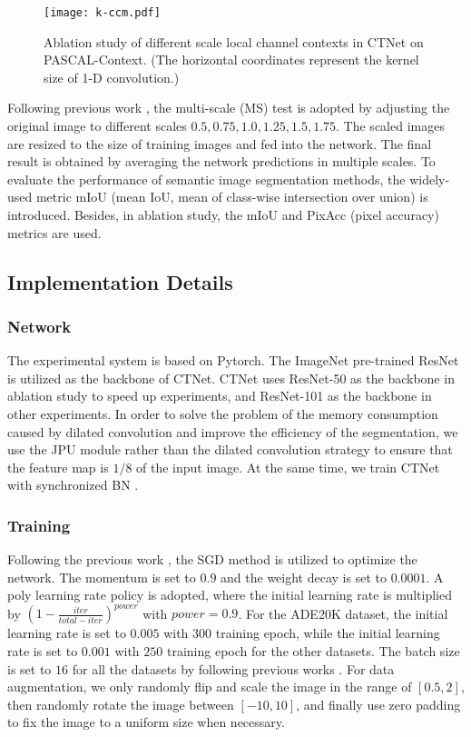 \documentclass[10pt,journal,cspaper,compsoc]{IEEEtran}
\begin{document}
\begin{figure}
\centering
\texttt{[image: k-ccm.pdf]}
\caption{Ablation study of different scale local channel contexts in CTNet on PASCAL-Context. (The horizontal coordinates represent the kernel size of 1-D convolution.)}
\label{fig7}
\end{figure}
	
Following previous work \cite{huang2019ccnet, fu2019dual, zhang2019co}, the multi-scale (MS) test is adopted by adjusting the original image to different scales ${0.5, 0.75, 1.0, 1.25, 1.5, 1.75}$. The scaled images are resized to the size of training images and fed into the network. The final result is obtained by averaging the network predictions in multiple scales. To evaluate the performance of semantic image segmentation methods, the widely-used metric mIoU (mean IoU, mean of class-wise intersection over union) is introduced. Besides, in ablation study, the mIoU and PixAcc (pixel accuracy) metrics are used.
	
\subsection{Implementation Details}
\subsubsection{Network}
The experimental system is based on Pytorch. The ImageNet pre-trained ResNet \cite{he2016deep} is utilized as the backbone of CTNet. CTNet uses ResNet-50 as the backbone in ablation study to speed up experiments, and ResNet-101 as the backbone in other experiments. In order to solve the problem of the memory consumption caused by dilated convolution and improve the efficiency of the segmentation, we use the JPU \cite{wu2019fastfcn} module rather than the dilated convolution strategy \cite{huang2019ccnet, fu2019dual, li2019expectation} to ensure that the feature map is $1/8$ of the input image. At the same time, we train CTNet with synchronized BN \cite{wu2019fastfcn}.
	
\subsubsection{Training}
Following the previous work \cite{chen2017rethinking, zhang2019co}, the SGD method is utilized to optimize the network. The momentum is set to $0.9$ and the weight decay is set to $0.0001$.  A poly learning rate policy is adopted, where the initial learning rate is multiplied by $(1-\frac{iter}{total-iter})^{power}$ with $power=0.9$. For the ADE20K dataset, the initial learning rate is set to $0.005$ with $300$ training epoch, while the initial learning rate is set to $0.001$ with $250$ training epoch for the other datasets. The batch size is set to $16$ for all the datasets by following previous works \cite{wu2019fastfcn, zhang2019co, yuan2020object}. For data augmentation, we only randomly flip and scale the image in the range of $[0.5, 2]$, then randomly rotate the image between $[-10, 10]$, and finally use zero padding to fix the image to a uniform size when necessary.
	
\end{document}
